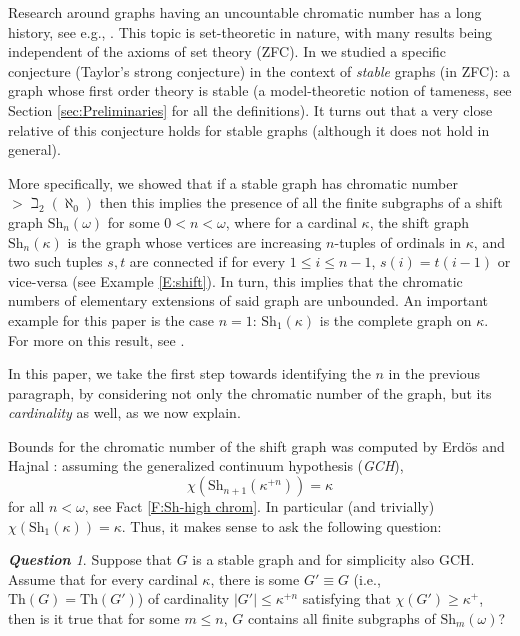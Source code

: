 \documentclass[a4paper]{amsart}
\theoremstyle{plain}
\theoremstyle{definition}
\theoremstyle{remark}
\newtheorem{question}[theorem]{\textbf{Question}}
\numberwithin{equation}{section}
\newcounter{step}                   %
\newcommand{\Sh}{\text{Sh}}
\begin{document}
Research around graphs having an uncountable chromatic number has a long history, see e.g., \cite[Section 3]{komjath}. This topic is set-theoretic in nature, with many results being independent of the axioms of set theory (ZFC). In \cite{1196,1211} we studied a specific conjecture (Taylor's strong conjecture) in the context of \emph{stable} graphs (in ZFC): a graph whose first order theory is stable (a model-theoretic notion of tameness, see Section \ref{sec:Preliminaries} for all the definitions). It turns out that a very close relative of this conjecture holds for stable graphs (although it does not hold in general).

More specifically, we showed that if a stable graph has chromatic number $>\beth_2(\aleph_0)$ then this implies the presence of all the finite subgraphs of a shift graph $\Sh_n(\omega)$ for some $0<n < \omega$, where for a cardinal $\kappa$, the shift graph $\Sh_n(\kappa)$ is the graph whose vertices are increasing $n$-tuples of ordinals in $\kappa$, and two such tuples $s,t$ are connected if for every $1\leq i\leq n-1$, $s(i)=t(i-1)$ or vice-versa (see Example \ref{E:shift}). In turn, this implies that the chromatic numbers of elementary extensions of said graph are unbounded. An important example for this paper is the case $n=1$: $\Sh_1(\kappa)$ is the complete graph on $\kappa$. For more on this result, see \cite{1196,1211}. 

In this paper, we take the first step towards identifying the $n$ in the previous paragraph, by considering not only the chromatic number of the graph, but its \emph{cardinality} as well, as we now explain.

Bounds for the chromatic number of the shift graph was computed by Erd\"os and Hajnal \cite{EH}: assuming the generalized continuum hypothesis (\emph{GCH}), 
\[\chi(\Sh_{n+1}(\kappa^{+n}))=\kappa\]
for all $n<\omega$, see Fact \ref{F:Sh-high chrom}. In particular (and trivially) $\chi(\Sh_1(\kappa))= \kappa$. Thus, it makes sense to ask the following question:

\begin{question} \label{Q:The question on Ch}
  Suppose that $G$ is a stable graph and for simplicity also GCH. Assume that for every cardinal $\kappa$, there is some $G' \equiv G$ (i.e., $\mathrm{Th}(G)=\mathrm{Th}(G')$) of cardinality $|G'| \leq \kappa^{+n}$ satisfying that $\chi(G') \geq \kappa^+$, then is it true that for some $m \leq n$, $G$ contains all finite subgraphs of $\Sh_{m}(\omega)$?
\end{question}
\end{document}
